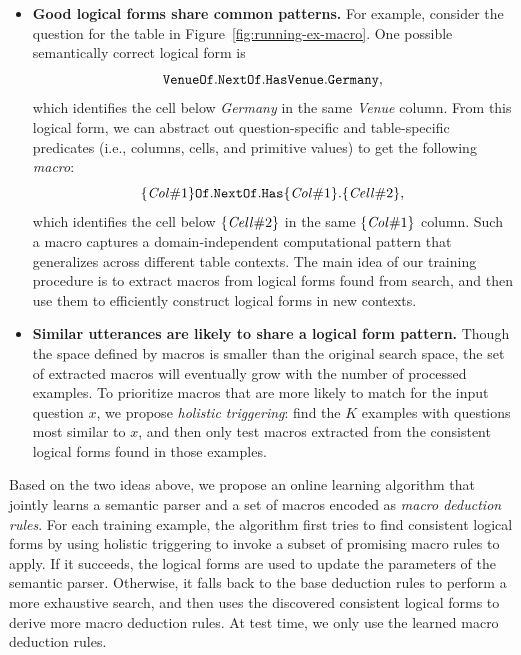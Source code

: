 \begin{itemize}
\item
\textbf{Good logical forms share common patterns.}
For example,
consider the question
for the table in Figure~\ref{fig:running-ex-macro}.
One possible semantically correct logical form is
\begin{equation}
{\texttt{Venue}}\texttt{Of}.{\texttt{Next}}\texttt{Of}.\texttt{Has}{\texttt{Venue}}.\texttt{Germany},
\end{equation}
which identifies the cell below \emph{Germany}
in the same \emph{Venue} column.
From this logical form,
we can abstract out question-specific and
table-specific predicates
(i.e., columns, cells, and primitive values) to get
the following \emph{macro}:
\begin{equation}
{\{\text{\emph{Col}}\#1\}}\texttt{Of}.{\texttt{Next}}\texttt{Of}.\texttt{Has}{\{\text{\emph{Col}}\#1\}}.\{\text{\emph{Cell}}\#2\},
\end{equation}
which identifies the cell below $\{\text{\emph{Cell}}\#2\}$
in the same $\{\text{\emph{Col}}\#1\}$ column.
Such a macro captures a domain-independent
computational pattern
that generalizes across different table contexts.
The main idea of
our training procedure
is to extract macros
from logical forms found from search,
and then use them to efficiently construct
logical forms in new contexts.

\item
\textbf{Similar utterances are likely to share a
logical form pattern.}
Though the space defined by macros is smaller
than the original search space,
the set of extracted macros will eventually grow
with the number of processed examples.
To prioritize macros that are more likely to match
for the input question $x$,
we propose \emph{holistic triggering}:
find the $K$ examples with questions most similar to $x$,
and then only test macros extracted from
the consistent logical forms found in those examples.
\end{itemize}

Based on the two ideas above,
we propose an online learning algorithm
that jointly learns a semantic parser
and a set of macros
encoded as \emph{macro deduction rules}.
For each training example,
the algorithm first tries to find consistent logical forms
by using holistic triggering to invoke a subset
of promising macro rules to apply.
If it succeeds, the logical forms
are used to update the parameters of the semantic parser.
Otherwise, it falls back to the
base deduction rules to perform a more exhaustive search,
and then uses the discovered consistent logical forms
to derive more macro deduction rules.
At test time, we only use the learned macro deduction rules.

